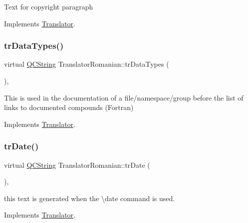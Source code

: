 Text for copyright paragraph 

Implements \mbox{\hyperlink{class_translator}{Translator}}.

\mbox{\label{class_translator_romanian_aea31bf7916645f6bdd294d7629432c0b}} 
\subsubsection{\texorpdfstring{trDataTypes()}{trDataTypes()}}
{\footnotesize\ttfamily virtual \mbox{\hyperlink{class_q_c_string}{Q\+C\+String}} Translator\+Romanian\+::tr\+Data\+Types (\begin{DoxyParamCaption}{ }\end{DoxyParamCaption})\hspace{0.3cm}{\ttfamily [inline]}, {\ttfamily [virtual]}}

This is used in the documentation of a file/namespace/group before the list of links to documented compounds (Fortran) 

Implements \mbox{\hyperlink{class_translator}{Translator}}.

\mbox{\label{class_translator_romanian_aece8149f11f3331b5b8218882be1a6f6}} 
\subsubsection{\texorpdfstring{trDate()}{trDate()}}
{\footnotesize\ttfamily virtual \mbox{\hyperlink{class_q_c_string}{Q\+C\+String}} Translator\+Romanian\+::tr\+Date (\begin{DoxyParamCaption}{ }\end{DoxyParamCaption})\hspace{0.3cm}{\ttfamily [inline]}, {\ttfamily [virtual]}}

this text is generated when the \textbackslash{}date command is used. 

Implements \mbox{\hyperlink{class_translator}{Translator}}.

\mbox{\label{class_translator_romanian_a94bd8e948397a46045bb5c755f88973d}} 
